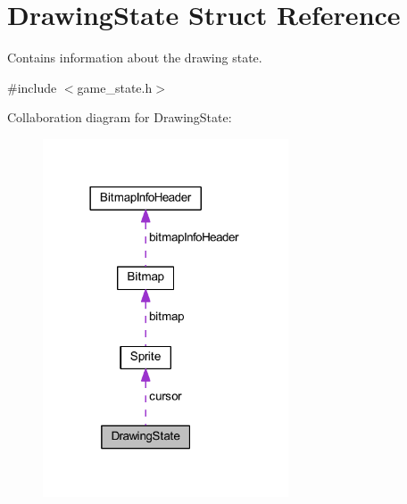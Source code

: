 \hypertarget{struct_drawing_state}{}\section{Drawing\+State Struct Reference}
\label{struct_drawing_state}


Contains information about the drawing state.  




{\ttfamily \#include $<$game\+\_\+state.\+h$>$}



Collaboration diagram for Drawing\+State\+:\nopagebreak
\begin{figure}[H]
\begin{center}
\leavevmode
\includegraphics[width=206pt]{struct_drawing_state__coll__graph}
\end{center}
\end{figure}
